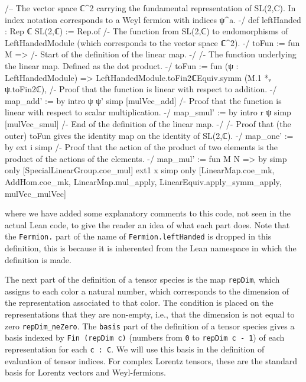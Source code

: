 \documentclass[a4paper, 11pt]{article}
\DeclareRobustCommand{\myinline}{\lstinline}
\begin{document}
\begin{codeLong}
/-- The vector space ℂ^2 carrying the fundamental representation of SL(2,C).
  In index notation corresponds to a Weyl fermion with indices ψ^a. -/
def leftHanded : Rep ℂ SL(2,ℂ) := Rep.of {
  /- The function from SL(2,ℂ) to endomorphisms of LeftHandedModule 
    (which corresponds to the vector space ℂ^2). -/
  toFun := fun M => {
    /- Start of the definition of the linear map. -/
    /- The function underlying the linear map. Defined as the dot product. -/
    toFun := fun (ψ : LeftHandedModule) =>
      LeftHandedModule.toFin2ℂEquiv.symm (M.1 *ᵥ ψ.toFin2ℂ),
    /- Proof that the function is linear with respect to addition. -/
    map_add' := by
      intro ψ ψ'
      simp [mulVec_add]
    /- Proof that the function is linear with respect to scalar multiplication. -/
    map_smul' := by
      intro r ψ
      simp [mulVec_smul]
    /- End of the definition of the linear map. -/}
  /- Proof that (the outer) toFun gives the identity map on the identity of SL(2,ℂ). -/
  map_one' := by
    ext i
    simp
  /- Proof that the action of the product of two elements is 
    the product of the actions of the elements. -/
  map_mul' := fun M N => by
    simp only [SpecialLinearGroup.coe_mul]
    ext1 x
    simp only [LinearMap.coe_mk, AddHom.coe_mk, LinearMap.mul_apply, LinearEquiv.apply_symm_apply,
      mulVec_mulVec]}
\end{codeLong} 
where we have added some explanatory comments to this code, not seen in the actual Lean code, to give 
the reader an idea of what each part does. Note that the \myinline|Fermion.| part of the name 
of \myinline|Fermion.leftHanded| is dropped in this definition, this is because it is inherented from 
the Lean namespace in which the definition is made.

The next part of the definition of a tensor species is the map \myinline|repDim|, which assigns to each color a natural number,
which corresponds to the dimension of the representation associated to that color. The condition is placed on the representations that they are non-empty, i.e., 
that the dimension is not equal to zero \myinline|repDim_neZero|.  
The \myinline|basis| part of the definition of a tensor species gives a basis indexed by \myinline|Fin (repDim c)| 
(numbers from \myinline|0| to \myinline|repDim c - 1|)  of each representation for each \myinline|c : C|.  
We will use this basis in the definition of evaluation of tensor indices. For complex Lorentz tensors, 
these are the standard basis for Lorentz vectors and Weyl-fermions. 
\end{document}
